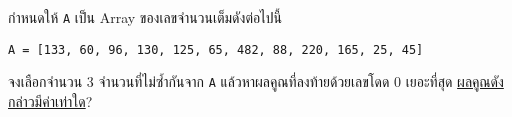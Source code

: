 \question{}

กำหนดให้ \lstinline{A} เป็น Array ของเลขจำนวนเต็มดังต่อไปนี้
\begin{center}
    \lstinline{A = [133, 60, 96, 130, 125, 65, 482, 88, 220, 165, 25, 45]}
\end{center}

จงเลือกจำนวน 3 จำนวนที่ไม่ซ้ำกันจาก \lstinline{A} แล้วหาผลคูณที่ลงท้ายด้วยเลขโดด 0 เยอะที่สุด
\uline{ผลคูณดังกล่าวมีค่าเท่าใด}?
